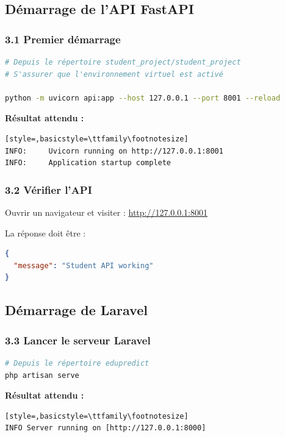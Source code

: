 \documentclass[12pt,a4paper]{article}
\begin{document}
\subsection{Démarrage de l'API FastAPI}

\subsubsection{3.1 Premier démarrage}

\begin{lstlisting}[language=bash]
# Depuis le répertoire student_project/student_project
# S'assurer que l'environnement virtuel est activé

python -m uvicorn api:app --host 127.0.0.1 --port 8001 --reload
\end{lstlisting}

\textbf{Résultat attendu :}
\begin{lstlisting}[style=,basicstyle=\ttfamily\footnotesize]
INFO:     Uvicorn running on http://127.0.0.1:8001
INFO:     Application startup complete
\end{lstlisting}

\subsubsection{3.2 Vérifier l'API}

Ouvrir un navigateur et visiter : \url{http://127.0.0.1:8001}

La réponse doit être :
\begin{lstlisting}[language=json]
{
  "message": "Student API working"
}
\end{lstlisting}

\subsection{Démarrage de Laravel}

\subsubsection{3.3 Lancer le serveur Laravel}

\begin{lstlisting}[language=bash]
# Depuis le répertoire edupredict
php artisan serve
\end{lstlisting}

\textbf{Résultat attendu :}
\begin{lstlisting}[style=,basicstyle=\ttfamily\footnotesize]
INFO Server running on [http://127.0.0.1:8000]
\end{lstlisting}
\end{document}
